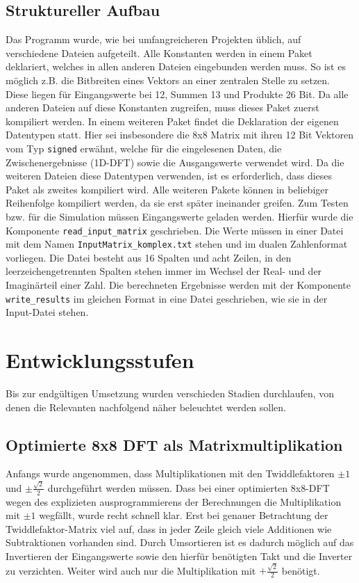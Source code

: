 \subsection{Struktureller Aufbau}
 Das Programm wurde, wie bei umfangreicheren Projekten üblich, auf verschiedene Dateien aufgeteilt. Alle Konstanten werden in einem Paket deklariert, welches in allen anderen Dateien
 eingebunden werden muss. So ist es möglich z.B. die Bitbreiten eines Vektors an einer zentralen Stelle zu setzen. Diese liegen für 
 Eingangswerte bei 12, Summen 13 und Produkte 26 Bit. Da alle anderen Dateien auf diese
 Konstanten zugreifen, muss dieses Paket zuerst kompiliert werden. In einem weiteren Paket findet die Deklaration der eigenen Datentypen statt. Hier sei
 insbesondere die 8x8 Matrix mit ihren 12 Bit Vektoren vom Typ \texttt{signed} erwähnt, welche für die eingelesenen 
 Daten, die Zwischenergebnisse (1D-DFT) sowie die Ausgangswerte verwendet wird.
 Da die weiteren Dateien diese Datentypen verwenden, ist es 
 erforderlich, dass dieses Paket als zweites kompiliert wird. Alle weiteren Pakete können in beliebiger Reihenfolge kompiliert werden, da sie erst später ineinander
 greifen. 
 Zum Testen bzw. für die Simulation müssen Eingangswerte geladen werden. Hierfür wurde die Komponente \texttt{read\_input\_matrix} geschrieben. Die Werte müssen
 in einer Datei mit dem Namen \texttt{InputMatrix\_komplex.txt} stehen und im dualen Zahlenformat vorliegen. 
 Die Datei besteht aus 16 Spalten und acht Zeilen, in den leerzeichengetrennten Spalten stehen immer im Wechsel der Real- und der Imaginärteil einer Zahl.
  Die berechneten Ergebnisse werden mit der Komponente \texttt{write\_results} im gleichen Format in eine Datei geschrieben, wie sie in der Input-Datei stehen. 



\section{Entwicklungsstufen}
Bis zur endgültigen Umsetzung wurden verschieden Stadien durchlaufen, von denen die Relevanten nachfolgend näher beleuchtet werden sollen.



\subsection{Optimierte 8x8 DFT als Matrixmultiplikation}\label{sec:OptimierteMatrixmultiplikation}


Anfangs wurde angenommen, dass Multiplikationen mit den Twiddlefaktoren $\pm 1$ und $\pm\frac{\sqrt{2}}{2}$ durchgeführt werden müssen. 
Dass bei einer optimierten 8x8-DFT wegen des explizieten ausprogrammierens der Berechnungen die Multiplikation mit $\pm1$ wegfällt, wurde recht schnell klar.
Erst bei genauer Betrachtung der Twiddlefaktor-Matrix viel auf, dass in jeder Zeile gleich viele Additionen wie Subtraktionen vorhanden sind. Durch Umsortieren 
ist es dadurch möglich auf das Invertieren der Eingangswerte sowie den hierfür benötigten Takt und die Inverter zu verzichten. Weiter wird auch nur die Multiplikation
mit $+\frac{\sqrt{2}}{2}$ benötigt.

